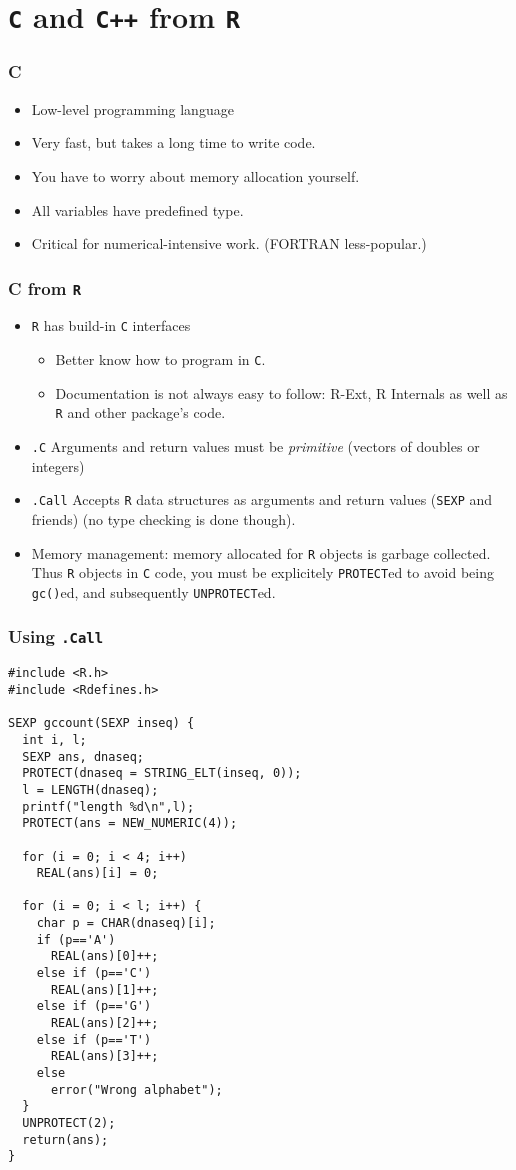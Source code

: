 \documentclass{beamer}
\newcommand{\R}{\texttt{R} }
\begin{document}
\section{\texttt{C} and \texttt{C++} from \R}
\label{sec-2}
\begin{frame}
\frametitle{C}
\label{sec-2-1}


\begin{itemize}
\item Low-level programming language
\item Very fast, but takes a long time to write code.
\item You have to worry about memory allocation yourself.
\item All variables have predefined type.
\item Critical for numerical-intensive work.  (FORTRAN less-popular.)
\end{itemize}
\end{frame}
\begin{frame}
\frametitle{C from \R}
\label{sec-2-2}


\begin{itemize}
\item \R has build-in \texttt{C} interfaces
\begin{itemize}
\item Better know how to program in \texttt{C}.
\item Documentation is not always easy to follow: R-Ext, R Internals as well as \R and other package's code.
\end{itemize}
\item \texttt{.C}  Arguments and return values must be \textit{primitive} (vectors of doubles or integers)
\item \texttt{.Call} Accepts \R data structures as arguments and return values (\texttt{SEXP} and friends) (no type checking is done though).
\item Memory management: memory allocated for \R objects is garbage collected. Thus \R objects in \texttt{C} code, you must be explicitely \texttt{PROTECT}ed to 
      avoid being \texttt{gc()}ed, and subsequently \texttt{UNPROTECT}ed.
\end{itemize}
\end{frame}
\begin{frame}[fragile]
\frametitle{Using \texttt{.Call}}
\label{sec-2-3}

\tiny

\begin{verbatim}
#include <R.h> 
#include <Rdefines.h>

SEXP gccount(SEXP inseq) {
  int i, l;
  SEXP ans, dnaseq;    
  PROTECT(dnaseq = STRING_ELT(inseq, 0)); 
  l = LENGTH(dnaseq); 
  printf("length %d\n",l);
  PROTECT(ans = NEW_NUMERIC(4));

  for (i = 0; i < 4; i++) 
    REAL(ans)[i] = 0;

  for (i = 0; i < l; i++) {
    char p = CHAR(dnaseq)[i];
    if (p=='A') 
      REAL(ans)[0]++;
    else if (p=='C') 
      REAL(ans)[1]++;
    else if (p=='G') 
      REAL(ans)[2]++;
    else if (p=='T') 
      REAL(ans)[3]++;
    else 
      error("Wrong alphabet");
  }
  UNPROTECT(2);
  return(ans);
}
\end{verbatim}
\end{frame}
\end{document}
